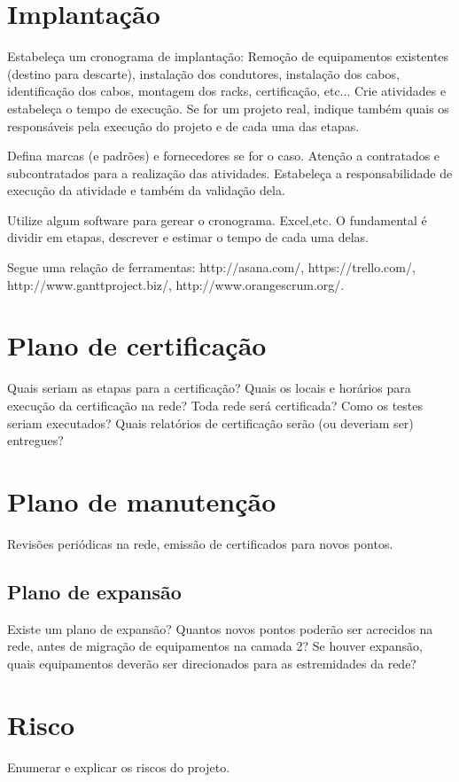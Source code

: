\documentclass[	DIV=calc,%
							paper=a4,%
							fontsize=12pt,%
							onecolumn]{scrartcl}	 					%
\begin{document}
\section{Implantação}
Estabeleça um cronograma de implantação:
Remoção de equipamentos existentes (destino para descarte), instalação dos condutores, instalação dos cabos, 
identificação dos cabos, montagem dos racks, certificação, etc... Crie atividades e estabeleça o tempo de execução. Se for um projeto real, indique também quais os responsáveis pela execução do projeto e de cada uma das etapas.

Defina marcas (e padrões) e fornecedores se for o caso. Atenção a contratados e subcontratados para a realização das atividades. Estabeleça a responsabilidade de execução da atividade e também da validação dela.

Utilize algum software para gerear o cronograma. Excel,etc. O fundamental é dividir em etapas, descrever e estimar o tempo de cada uma delas.

Segue uma relação de ferramentas:
http://asana.com/, 
https://trello.com/, 
http://www.ganttproject.biz/, 
http://www.orangescrum.org/. 

\section{Plano de certificação}
Quais seriam as etapas para a certificação? 
Quais os locais e horários para execução da certificação na rede? Toda rede será certificada?
Como os testes seriam executados?
Quais relatórios de certificação serão (ou deveriam ser) entregues? 

\section{Plano de manutenção}

Revisões periódicas na rede, emissão de certificados para novos pontos.

\subsection{Plano de expansão}
Existe um plano de expansão? Quantos novos pontos poderão ser acrecidos na rede, antes de migração de equipamentos na camada 2? Se houver expansão, quais equipamentos deverão ser direcionados para as estremidades da rede? 

\section{Risco}
Enumerar e explicar os riscos do projeto.
\end{document}
